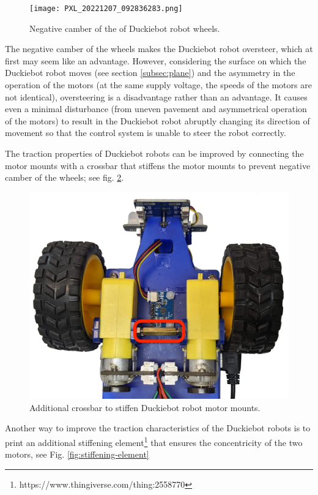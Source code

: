 \documentclass[conference]{IEEEtran}
\begin{document}
\begin{figure}
    \centering
    \texttt{[image: PXL\_20221207\_092836283.png]}
    \caption{Negative camber of the of Duckiebot robot wheels.}
    \label{fig:negative-camber}
\end{figure}

The negative camber of the wheels makes the Duckiebot robot oversteer, which at first may seem like an advantage. However, considering the surface on which the Duckiebot robot moves (see section \ref{subsec:plane}) and the asymmetry in the operation of the motors (at the same supply voltage, the speeds of the motors are not identical), oversteering is a disadvantage rather than an advantage. It causes even a minimal disturbance (from uneven pavement and asymmetrical operation of the motors) to result in the Duckiebot robot abruptly changing its direction of movement so that the control system is unable to steer the robot correctly. 

The traction properties of Duckiebot robots can be improved by connecting the motor mounts with a crossbar that stiffens the motor mounts to prevent negative camber of the wheels; see fig. \ref{fig:stiffening-crossbar}.

\begin{figure}[ht!]
    \centering
    \includegraphics[width=1.0\columnwidth]{drive-upgrade.png}
    \caption{Additional crossbar to stiffen Duckiebot robot motor mounts.}
    \label{fig:stiffening-crossbar}
\end{figure}

Another way to improve the traction characteristics of the Duckiebot robots is to print an additional stiffening element\footnote{https://www.thingiverse.com/thing:2558770} that ensures the concentricity of the two motors, see Fig. \ref{fig:stiffening-element}
\end{document}
